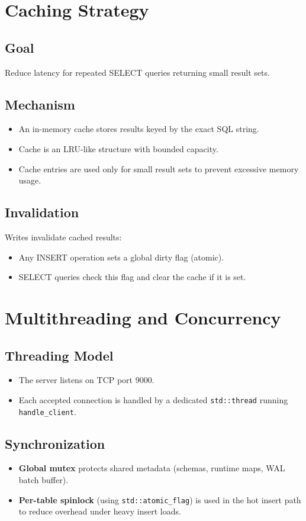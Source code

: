 \documentclass[11pt]{article}
\begin{document}
\section{Caching Strategy}
\subsection{Goal}
Reduce latency for repeated SELECT queries returning small result sets.

\subsection{Mechanism}
\begin{itemize}[leftmargin=*]
\item An in-memory cache stores results keyed by the exact SQL string.
\item Cache is an LRU-like structure with bounded capacity.
\item Cache entries are used only for small result sets to prevent excessive memory usage.
\end{itemize}

\subsection{Invalidation}
Writes invalidate cached results:

\begin{itemize}[leftmargin=*]
\item Any INSERT operation sets a global dirty flag (atomic).
\item SELECT queries check this flag and clear the cache if it is set.
\end{itemize}

\section{Multithreading and Concurrency}
\subsection{Threading Model}
\begin{itemize}[leftmargin=*]
\item The server listens on TCP port 9000.
\item Each accepted connection is handled by a dedicated \texttt{std::thread} running \texttt{handle\_client}.
\end{itemize}

\subsection{Synchronization}
\begin{itemize}[leftmargin=*]
\item \textbf{Global mutex} protects shared metadata (schemas, runtime maps, WAL batch buffer).
\item \textbf{Per-table spinlock} (using \texttt{std::atomic\_flag}) is used in the hot insert path to reduce overhead under heavy insert loads.
\end{itemize}
\end{document}

